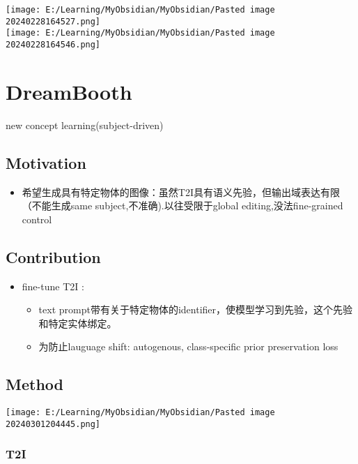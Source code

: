 \documentclass[
]{article}
\providecommand{\tightlist}{%
  \setlength{\itemsep}{0pt}\setlength{\parskip}{0pt}}
\begin{document}
\texttt{[image: E:/Learning/MyObsidian/MyObsidian/Pasted image 20240228164527.png]}\\
\texttt{[image: E:/Learning/MyObsidian/MyObsidian/Pasted image 20240228164546.png]}

\section{DreamBooth}\label{dreambooth}

new concept learning(subject-driven)

\subsection{Motivation}\label{motivation-1}

\begin{itemize}
\tightlist
\item
  希望生成具有特定物体的图像：虽然T2I具有语义先验，但输出域表达有限（不能生成same
  subject,不准确).以往受限于global editing,没法fine-grained control
\end{itemize}

\subsection{Contribution}\label{contribution-1}

\begin{itemize}
\tightlist
\item
  fine-tune T2I :

  \begin{itemize}
  \tightlist
  \item
    text
    prompt带有关于特定物体的identifier，使模型学习到先验，这个先验和特定实体绑定。
  \item
    为防止lauguage shift: autogenous, class-specific prior preservation
    loss
  \end{itemize}
\end{itemize}

\subsection{Method}\label{method-1}

\texttt{[image: E:/Learning/MyObsidian/MyObsidian/Pasted image 20240301204445.png]}

\subsubsection{T2I}\label{t2i}
\end{document}
